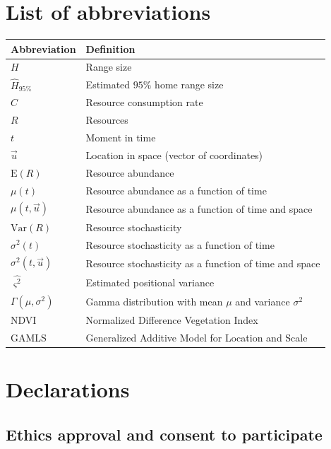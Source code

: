 \documentclass[
  12pt,
]{article}
\begin{document}
\section{List of abbreviations}\label{list-of-abbreviations}

\begin{tabular}{l|l}
\hline
\textbf{Abbreviation} & \textbf{Definition}\\
\hline
$H$ & Range size\\
\hline
$\hat H_{95\%}$ & Estimated $95\%$ home range size\\
\hline
$C$ & Resource consumption rate\\
\hline
$R$ & Resources\\
\hline
$t$ & Moment in time\\
\hline
$\vec u$ & Location in space (vector of coordinates)\\
\hline
$\text{E}(R)$ & Resource abundance\\
\hline
$\mu(t)$ & Resource abundance as a function of time\\
\hline
$\mu(t, \vec u)$ & Resource abundance as a function of time and space\\
\hline
$\text{Var}(R)$ & Resource stochasticity\\
\hline
$\sigma^2(t)$ & Resource stochasticity as a function of time\\
\hline
$\sigma^2(t, \vec u)$ & Resource stochasticity as a function of time and space\\
\hline
$\hat{\varsigma^2}$ & Estimated positional variance\\
\hline
$\Gamma(\mu, \sigma^2)$ & Gamma distribution with mean $\mu$ and variance $\sigma^2$\\
\hline
NDVI & Normalized Difference Vegetation Index\\
\hline
GAMLS & Generalized Additive Model for Location and Scale\\
\hline
\end{tabular}

\section{Declarations}\label{declarations}

\subsection{Ethics approval and consent to participate}\label{ethics-approval-and-consent-to-participate}
\end{document}
